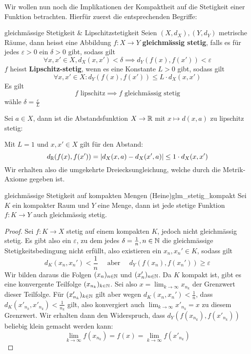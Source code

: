 Wir wollen nun noch die Implikationen der Kompaktheit auf die Stetigkeit einer Funktion betrachten. Hierfür zuerst die entsprechenden Begriffe:

\begin{definition}{gleichmässige Stetigkeit \& Lipschitzstetigkeit}{}
Seien $(X, d_X), (Y, d_Y)$ metrische Räume, dann heisst eine Abbildung $f: X \to Y$ \textbf{gleichmässig stetig}, falls es für jedes $\varepsilon>0$ ein $\delta>0$ gibt, sodass gilt
$$\forall x,x' \in X, d_X(x,x') < \delta \implies d_Y(f(x), f(x')) < \varepsilon$$
$f$ heisst \textbf{Lipschitz-stetig}, wenn es eine Konstante $L>0$ gibt, sodass gilt
$$\forall x,x' \in X: d_Y(f(x), f(x')) \leq L \cdot d_X(x,x')$$
Es gilt $$f  \text{ lipschitz} \implies f \text{ gleichmässig stetig}$$
wähle $\delta = \frac{\varepsilon}{L}$
\end{definition}
\begin{example}
Sei $a \in X$, dann ist die Abstandsfunktion $X \to \mathbb{R}$ mit $x \mapsto d(x,a)$ zu lipschitz stetig:

Mit $L = 1$ und $x, x' \in X$ gilt für den Abstand:
$$d_{\mathbb{R}}(f(x), f(x')) = \left|d_X(x,a) - d_X(x',a)\right| \leq 1 \cdot d_X(x,x')$$
Wir erhalten also die umgekehrte Dreiecksungleichung, welche durch die Metrik-Axiome gegeben ist.
\end{example}

\begin{satz}{gleichmässige Stetigkeit auf kompakten Mengen (Heine)}{glm_stetig_kompakt}
Sei $K$ ein kompakter Raum und $Y$ eine Menge, dann ist jede stetige Funktion $f: K \to Y$ auch gleichmässig stetig.
\end{satz}
\begin{proof}
Sei $f: K \to X$ stetig auf einem kompakten $K$, jedoch nicht gleichmässig stetig. Es gibt also ein $\varepsilon$, zu dem jedes $\delta = \frac{1}{n}, n \in \mathbb{N}$ die gleichmässige Stetigkeitsbedingung nicht erfüllt, also existieren ein $x_n, x_n' \in K$, sodass gilt
$$d_K(x_n, x_n') < \frac{1}{n} \quad \text{ aber }\quad d_Y(f(x_n), f(x_n')) \geq \varepsilon$$
Wir bilden daraus die Folgen $(x_n)_{n \in \mathbb{N}}$ und $(x'_n)_{n \in \mathbb{N}}$. Da $K$ kompakt ist, gibt es eine konvergente Teilfolge $(x_{n_k})_{k \in \mathbb{N}}$. Sei also $x = \lim_{k \to \infty}x_{n_k}$ der Grenzwert dieser Teilfolge. Für $(x'_{n_k})_{k\in\mathbb{N}}$ gilt aber wegen $d_K(x_n, x_n') < \frac{1}{n}$, dass $d_K(x'_{n_k}, x'_{n_k}) < \frac{1}{n_k}$ gilt, also konvergiert auch $\lim_{k \to \infty} x'_{n_k} = x$ zu diesem Grenzwert. Wir erhalten dann den Widerspruch, dass $d_Y(f(x_{n_k}), f(x'_{n_k}))$ beliebig klein gemacht werden kann:
$$\lim_{k \to \infty}f(x_{n_k}) = f(x) = \lim_{k \to \infty}f(x'_{n_k})$$
\end{proof}

